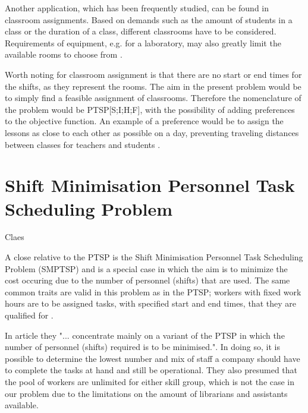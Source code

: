 Another application, which has been frequently studied, can be found in classroom assignments. Based on demands such as the amount of students in a class or the duration of a class, different classrooms have to be considered. Requirements of equipment, e.g. for a laboratory, may also greatly limit the available rooms to choose from \cite{krishnamoorthy_2001}.

Worth noting for classroom assignment is that there are no start or end times for the shifts, as they represent the rooms. The aim in the present problem would be to simply find a feasible assignment of classrooms. Therefore the nomenclature of the problem would be PTSP[S;I;H;F], with the possibility of adding preferences to the objective function. An example of a preference would be to assign the lessons as close to each other as possible on a day, preventing traveling distances between classes for teachers and students \cite{krishnamoorthy_2001}.



%
%

\section{Shift Minimisation Personnel Task Scheduling Problem}\label{SMTSP}
Claes

A close relative to the PTSP is the Shift Minimisation Personnel Task Scheduling Problem (SMPTSP) and is a special case in which the aim is to minimize the cost occuring due to the number of personnel (shifts) that are used. The same common traits are valid in this problem as in the PTSP; workers with fixed work hours are to be assigned tasks, with specified start and end times, that they are qualified for \cite{krishnamoorthy_2011}.

In article \cite{krishnamoorthy_2011} they "... concentrate mainly on a variant of the PTSP in which the number of personnel (shifts) required is to be minimised.". In doing so, it is possible to determine the lowest number and mix of staff a company should have to complete the tasks at hand and still be operational. They also presumed that the pool of workers are unlimited for either skill group, which is not the case in our problem due to the limitations on the amount of librarians and assistants available. 

